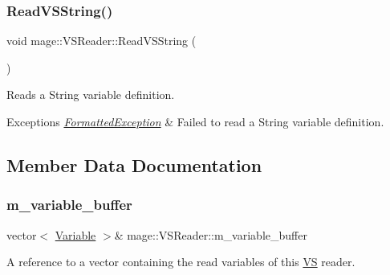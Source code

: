\subsubsection{\texorpdfstring{Read\+V\+S\+String()}{ReadVSString()}}
{\footnotesize\ttfamily void mage\+::\+V\+S\+Reader\+::\+Read\+V\+S\+String (\begin{DoxyParamCaption}{ }\end{DoxyParamCaption})\hspace{0.3cm}{\ttfamily [private]}}

Reads a String variable definition.


\begin{DoxyExceptions}{Exceptions}
{\em \hyperlink{structmage_1_1_formatted_exception}{Formatted\+Exception}} & Failed to read a String variable definition. \\
\hline
\end{DoxyExceptions}


\subsection{Member Data Documentation}
\hypertarget{classmage_1_1_v_s_reader_a535a576912adc3dadb1523280b5e5fc3}{}\label{classmage_1_1_v_s_reader_a535a576912adc3dadb1523280b5e5fc3} 
\subsubsection{\texorpdfstring{m\+\_\+variable\+\_\+buffer}{m\_variable\_buffer}}
{\footnotesize\ttfamily vector$<$ \hyperlink{structmage_1_1_variable}{Variable} $>$\& mage\+::\+V\+S\+Reader\+::m\+\_\+variable\+\_\+buffer\hspace{0.3cm}{\ttfamily [private]}}

A reference to a vector containing the read variables of this \hyperlink{structmage_1_1_v_s}{VS} reader. 